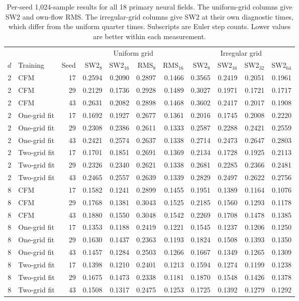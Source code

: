 \begin{table}[t]
\centering
\caption{Per-seed 1,024-sample results for all 18 primary neural fields. The uniform-grid columns give SW2 and own-flow RMS. The irregular-grid columns give SW2 at their own diagnostic times, which differ from the uniform quarter times. Subscripts are Euler step counts. Lower values are better within each measurement.}
\label{tab:seed-grid-details}
\small
\begin{tabular}{@{}rlr rrrr rrrr@{}}
\toprule
& & & \multicolumn{4}{c}{Uniform grid} & \multicolumn{4}{c}{Irregular grid}\\
$d$ & Training & Seed & SW2$_8$ & SW2$_{16}$ & RMS$_8$ & RMS$_{16}$
 & SW2$_8$ & SW2$_{16}$ & SW2$_{32}$ & SW2$_{64}$\\
\midrule
2 & CFM & 17 & 0.2594 & 0.2090 & 0.2897 & 0.1466 & 0.3565 & 0.2419 & 0.2051 & 0.1961\\
2 & CFM & 29 & 0.2129 & 0.1736 & 0.2928 & 0.1489 & 0.3027 & 0.1971 & 0.1721 & 0.1717\\
2 & CFM & 43 & 0.2631 & 0.2082 & 0.2898 & 0.1468 & 0.3602 & 0.2417 & 0.2017 & 0.1908\\
2 & One-grid fit & 17 & 0.1692 & 0.1927 & 0.2677 & 0.1361 & 0.2016 & 0.1745 & 0.2008 & 0.2220\\
2 & One-grid fit & 29 & 0.2308 & 0.2386 & 0.2611 & 0.1333 & 0.2587 & 0.2288 & 0.2421 & 0.2559\\
2 & One-grid fit & 43 & 0.2421 & 0.2574 & 0.2637 & 0.1338 & 0.2714 & 0.2473 & 0.2647 & 0.2803\\
2 & Two-grid fit & 17 & 0.1701 & 0.1851 & 0.2691 & 0.1369 & 0.2134 & 0.1728 & 0.1925 & 0.2113\\
2 & Two-grid fit & 29 & 0.2326 & 0.2340 & 0.2621 & 0.1338 & 0.2681 & 0.2285 & 0.2366 & 0.2481\\
2 & Two-grid fit & 43 & 0.2465 & 0.2557 & 0.2639 & 0.1339 & 0.2829 & 0.2497 & 0.2622 & 0.2756\\
\midrule
8 & CFM & 17 & 0.1582 & 0.1241 & 0.2899 & 0.1455 & 0.1951 & 0.1389 & 0.1164 & 0.1076\\
8 & CFM & 29 & 0.1768 & 0.1381 & 0.3043 & 0.1525 & 0.2185 & 0.1560 & 0.1293 & 0.1178\\
8 & CFM & 43 & 0.1880 & 0.1550 & 0.3048 & 0.1542 & 0.2269 & 0.1708 & 0.1478 & 0.1385\\
8 & One-grid fit & 17 & 0.1353 & 0.1188 & 0.2419 & 0.1221 & 0.1545 & 0.1237 & 0.1206 & 0.1250\\
8 & One-grid fit & 29 & 0.1630 & 0.1437 & 0.2363 & 0.1193 & 0.1824 & 0.1508 & 0.1393 & 0.1350\\
8 & One-grid fit & 43 & 0.1457 & 0.1284 & 0.2503 & 0.1266 & 0.1667 & 0.1349 & 0.1265 & 0.1309\\
8 & Two-grid fit & 17 & 0.1398 & 0.1210 & 0.2401 & 0.1213 & 0.1594 & 0.1274 & 0.1199 & 0.1238\\
8 & Two-grid fit & 29 & 0.1675 & 0.1473 & 0.2338 & 0.1181 & 0.1870 & 0.1548 & 0.1426 & 0.1378\\
8 & Two-grid fit & 43 & 0.1508 & 0.1317 & 0.2475 & 0.1253 & 0.1725 & 0.1392 & 0.1279 & 0.1292\\
\bottomrule
\end{tabular}
\end{table}
